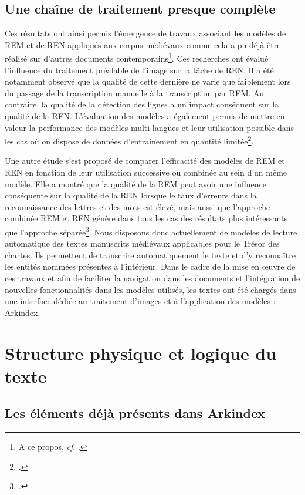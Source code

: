 \documentclass[a4paper,12pt,twoside]{book}
\begin{document}
	\subsection{Une chaîne de traitement presque complète}
	
	Ces résultats ont ainsi permis l'émergence de travaux associant les modèles de REM et de REN appliqués aux corpus médiévaux comme cela a pu déjà être réalisé sur d'autres documents contemporains\footnote{A ce propos, \textit{cf}. \cite{scheithauer_reconnaissanc_2021}.}. Ces recherches ont évalué l'influence du traitement préalable de l'image sur la tâche de REN. Il a été notamment observé que la qualité de cette dernière ne varie que faiblement lors du passage de la transcription manuelle à la transcription par REM. Au contraire, la qualité de la détection des lignes a un impact conséquent sur la qualité de la REN. L'évaluation des modèles a également permis de mettre en valeur la performance des modèles multi-langues et leur utilisation possible dans les cas où on dispose de données d'entrainement en quantité limitée\footcite{monroc_comprehensive_2022}. 
	
	Une autre étude s'est proposé de comparer l'efficacité des modèles de REM et REN en fonction de leur utilisation successive ou combinée au sein d'un même modèle. Elle a montré que la qualité de la REM peut avoir une influence conséquente sur la qualité de la REN lorsque le taux d'erreurs dans la reconnaissance des lettres et des mots est élevé, mais aussi que l'approche combinée REM et REN génère dans tous les cas des résultats plus intéressants que l'approche séparée\footcite{boros_comparison_2020}. Nous disposons donc actuellement de modèles de lecture automatique des textes manuscrits médiévaux applicables pour le Trésor des chartes. Ils permettent de transcrire automatiquement le texte et d'y reconnaître les entités nommées présentes à l'intérieur. Dans le cadre de la mise en œuvre de ces travaux et afin de faciliter la navigation dans les documents et l'intégration de nouvelles fonctionnalités dans les modèles utilisés, les textes ont été chargés dans une interface dédiée au traitement d'images et à l'application des modèles : Arkindex.
	
	\section{Structure physique et logique du texte}
	
	\subsection{Les éléments déjà présents dans Arkindex}
	
\end{document}
